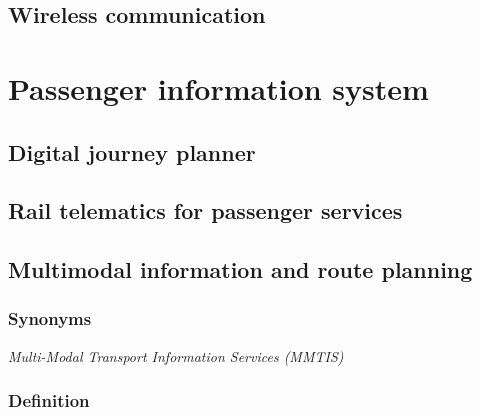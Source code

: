 \documentclass[
]{book}
\begin{document}
\hypertarget{wireless_com}{%
\section{Wireless communication}\label{wireless_com}}

\hypertarget{passenger}{%
\chapter{Passenger information system}\label{passenger}}

\hypertarget{djp}{%
\section{Digital journey planner}\label{djp}}

\hypertarget{telematics_passenger}{%
\section{Rail telematics for passenger services}\label{telematics_passenger}}

\hypertarget{info_and_route_planning}{%
\section{Multimodal information and route planning}\label{info_and_route_planning}}

\hypertarget{synonyms-10}{%
\subsection*{Synonyms}\label{synonyms-10}}

\emph{Multi-Modal Transport Information Services (MMTIS)}

\hypertarget{definition-10}{%
\subsection*{Definition}\label{definition-10}}
\end{document}
